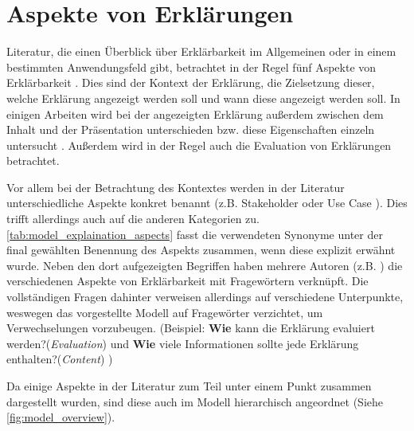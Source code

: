 \section{Aspekte von Erklärungen}
\label{sec:model_explanation_aspects}

Literatur, die einen Überblick über Erklärbarkeit im Allgemeinen oder in einem bestimmten Anwendungsfeld gibt, betrachtet in der Regel fünf Aspekte von Erklärbarkeit \cite{rosenfeld_explainability_2019, nunes_systematic_2017,chazette_knowledge_nodate}. Dies sind der Kontext der Erklärung, die Zielsetzung dieser, welche Erklärung angezeigt werden soll und wann diese angezeigt werden soll. In einigen Arbeiten wird bei der angezeigten Erklärung außerdem zwischen dem Inhalt und der Präsentation unterschieden bzw. diese Eigenschaften einzeln untersucht \cite{nunes_systematic_2017,abdulrahman_belief-based_2019}. Außerdem wird in der Regel auch die Evaluation von Erklärungen betrachtet.

Vor allem bei der Betrachtung des Kontextes werden in der Literatur unterschiedliche Aspekte konkret benannt (z.B. \glqq Stakeholder\grqq{} \cite{rosenfeld_explainability_2019} oder \glqq Use Case\grqq{} \cite{waa_evaluating_2021}). Dies trifft allerdings auch auf die anderen Kategorien zu. \autoref{tab:model_explaination_aspects} fasst die verwendeten Synonyme unter der final gewählten Benennung des Aspekts zusammen, wenn diese explizit erwähnt wurde. Neben den dort aufgezeigten Begriffen haben mehrere Autoren (z.B. \cite{rosenfeld_explainability_2019, chazette2020explainability}) die verschiedenen Aspekte von Erklärbarkeit mit Fragewörtern verknüpft. Die vollständigen Fragen dahinter verweisen allerdings auf verschiedene Unterpunkte, weswegen das vorgestellte Modell auf Fragewörter verzichtet, um Verwechselungen vorzubeugen. (Beispiel: \glqq \textbf{Wie} kann die Erklärung evaluiert werden?\grqq (\textit{Evaluation})\cite[vgl.][]{rosenfeld_explainability_2019} und \glqq \textbf{Wie} viele Informationen sollte jede Erklärung enthalten?\grqq (\textit{Content}) \cite[vgl.][]{kouki_user_2017})

Da einige Aspekte in der Literatur zum Teil unter einem Punkt zusammen dargestellt wurden, sind diese auch im Modell hierarchisch angeordnet (Siehe \autoref{fig:model_overview}).

\newpage

